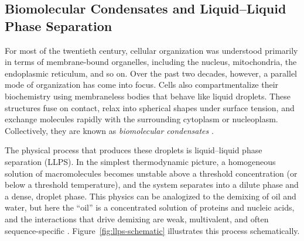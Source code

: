 \subsection{Biomolecular Condensates and Liquid--Liquid Phase Separation}

For most of the twentieth century, cellular organization was understood primarily
in terms of membrane-bound organelles, including the nucleus, mitochondria, the endoplasmic
reticulum, and so on. Over the past two decades, however, a parallel mode of
organization has come into focus. Cells also compartmentalize their biochemistry
using membraneless bodies that behave like liquid droplets. These structures fuse
on contact, relax into spherical shapes under surface tension, and exchange
molecules rapidly with the surrounding cytoplasm or nucleoplasm. Collectively,
they are known as \emph{biomolecular condensates}
\cite{Banani2017Review,Brangwynne2009,Hyman2014,Shin2017LLPS}.

The physical process that produces these droplets is liquid--liquid phase
separation (LLPS). In the simplest thermodynamic picture, a homogeneous solution
of macromolecules becomes unstable above a threshold concentration (or below a
threshold temperature), and the system separates into a dilute phase and a dense,
droplet phase. This physics can be analogized to the demixing of oil and water, but here the ``oil'' is a concentrated solution of proteins and nucleic acids, and the interactions that drive demixing are weak, multivalent, and often
sequence-specific \cite{Banani2017Review,Shin2017LLPS}.
Figure~\ref{fig:llps-schematic} illustrates this process schematically.

